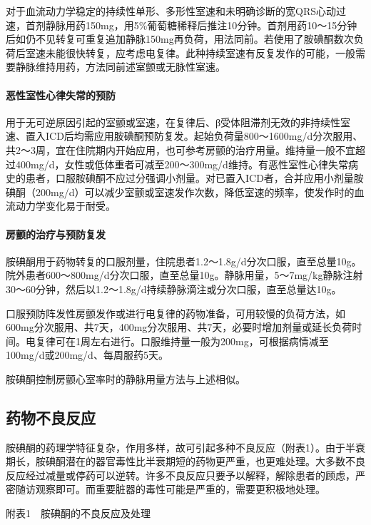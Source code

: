 对于血流动力学稳定的持续性单形、多形性室速和未明确诊断的宽QRS心动过速，首剂静脉用药150mg，用5\%葡萄糖稀释后推注10分钟。首剂用药10～15分钟后如仍不见转复可重复追加静脉150mg再负荷，用法同前。若使用了胺碘酮数次负荷后室速未能很快转复，应考虑电复律。此种持续室速有反复发作的可能，一般需要静脉维持用药，方法同前述室颤或无脉性室速。

\paragraph{恶性室性心律失常的预防}

用于无可逆原因引起的室颤或室速，在复律后、β受体阻滞剂无效的非持续性室速、置入ICD后均需应用胺碘酮预防复发。起始负荷量800～1600mg/d分次服用、共2～3周，宜在住院期内开始应用，也可参考房颤的治疗用量。维持量一般不宜超过400mg/d，女性或低体重者可减至200～300mg/d维持。有恶性室性心律失常病史的患者，口服胺碘酮不应过分强调小剂量。对已置入ICD者，合并应用小剂量胺碘酮（200mg/d）可以减少室颤或室速发作次数，降低室速的频率，使发作时的血流动力学变化易于耐受。

\paragraph{房颤的治疗与预防复发}

胺碘酮用于药物转复的口服剂量，住院患者1.2～1.8g/d分次口服，直至总量10g。院外患者600～800mg/d分次口服，直至总量10g。静脉用量，5～7mg/kg静脉注射30～60分钟，然后以1.2～1.8g/d持续静脉滴注或分次口服，直至总量达10g。

口服预防阵发性房颤发作或进行电复律的药物准备，可用较慢的负荷方法，如600mg分次服用、共7天，400mg分次服用、共7天，必要时增加剂量或延长负荷时间。电复律可在1周左右进行。口服维持量一般为200mg，可根据病情减至100mg/d或200mg/d、每周服药5天。

胺碘酮控制房颤心室率时的静脉用量方法与上述相似。

\subsection{药物不良反应}

胺碘酮的药理学特征复杂，作用多样，故可引起多种不良反应（附表1）。由于半衰期长，胺碘酮潜在的器官毒性比半衰期短的药物更严重，也更难处理。大多数不良反应经过减量或停药可以逆转。许多不良反应只要予以解释，解除患者的顾虑，严密随访观察即可。而重要脏器的毒性可能是严重的，需要更积极地处理。

附表1　胺碘酮的不良反应及处理

